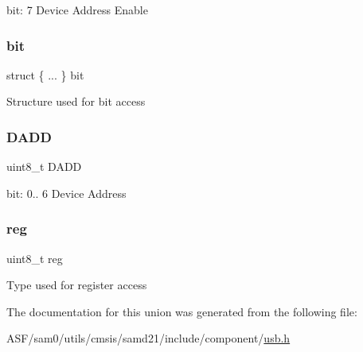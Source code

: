 bit\+: 7 Device Address Enable \mbox{\label{union_u_s_b___d_e_v_i_c_e___d_a_d_d___type_a88125f6241480dbcc78fe7b00d6f7db1}} 
\subsubsection{\texorpdfstring{bit}{bit}}
{\footnotesize\ttfamily struct \{ ... \}   bit}

Structure used for bit access \mbox{\label{union_u_s_b___d_e_v_i_c_e___d_a_d_d___type_af57daee87bac1512652f8269e6f5d01d}} 
\subsubsection{\texorpdfstring{DADD}{DADD}}
{\footnotesize\ttfamily uint8\+\_\+t D\+A\+DD}

bit\+: 0.. 6 Device Address \mbox{\label{union_u_s_b___d_e_v_i_c_e___d_a_d_d___type_a9428adc9af4653a2050e2536b55dec8d}} 
\subsubsection{\texorpdfstring{reg}{reg}}
{\footnotesize\ttfamily uint8\+\_\+t reg}

Type used for register access 

The documentation for this union was generated from the following file\+:\begin{DoxyCompactItemize}
\item 
A\+S\+F/sam0/utils/cmsis/samd21/include/component/\mbox{\hyperlink{component_2usb_8h}{usb.\+h}}\end{DoxyCompactItemize}

